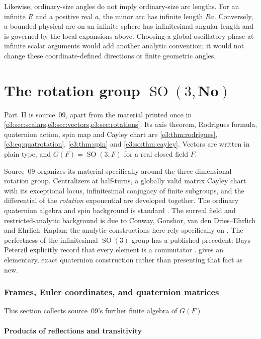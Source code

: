 \documentclass[11pt,letterpaper]{article}
\numberwithin{equation}{section}
\theoremstyle{definition}
\theoremstyle{remark}
\newcommand{\No}{\mathbf{No}}
\newcommand{\SO}{\operatorname{SO}}
\begin{document}
Likewise, ordinary-size angles do not imply ordinary-size arc lengths.
For an infinite $R$ and a positive real $a$, the minor arc has infinite
length $Ra$. Conversely, a bounded physical arc on an infinite sphere
has infinitesimal angular length and is governed by the local expansions
above. Choosing a global oscillatory phase at infinite scalar arguments
would add another analytic convention; it would not change these
coordinate-defined directions or finite geometric angles.

\part{The rotation group \texorpdfstring{$\SO(3,\No)$}{SO(3,No)}}\label{e3:part:so}

Part~II is source~09, apart from the material printed once in
\cref{e3:sec:scalars,e3:sec:vectors,e3:sec:rotations}. Its axis theorem, Rodrigues
formula, quaternion action, spin map and Cayley chart are \cref{e3:thm:rodrigues},
\cref{e3:eq:quatrotation}, \cref{e3:thm:spin} and \cref{e3:so:thm:cayley}.
Vectors are written in plain type, and $G(F)=\SO(3,F)$ for a real closed field $F$.

Source~09 organizes its material specifically around the three-dimensional
rotation group. Centralizers at half-turns, a globally valid matrix Cayley chart
with its exceptional locus, infinitesimal conjugacy of finite subgroups, and the
differential of the \emph{rotation} exponential are developed together. The
ordinary quaternion algebra and spin background is standard \cite{Voight}. The
surreal field and restricted-analytic background is due to Conway, Gonshor, van
den Dries--Ehrlich and Ehrlich--Kaplan; the analytic constructions here rely
specifically on \cite{vdDE,EK}. The perfectness of the infinitesimal $\SO(3)$
group has a published precedent: Bays--Peterzil explicitly record that every
element is a commutator \cite[\S3.1]{BP}.  gives an
elementary, exact quaternion construction rather than presenting that fact as
new.

\section{Frames, Euler coordinates, and quaternion matrices}\label{e3:so:sec:frames}

This section collects source~09's further finite algebra of $G(F)$.

\subsection{Products of reflections and transitivity}
\end{document}
